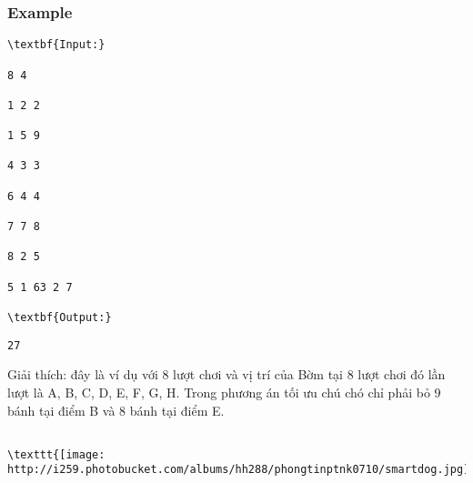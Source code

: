\subsubsection{   Example  }
\begin{verbatim}
\textbf{Input:}

8 4

1 2 2

1 5 9

4 3 3

6 4 4

7 7 8

8 2 5

5 1 63 2 7

\textbf{Output:}\end{verbatim}
\begin{verbatim}
27\end{verbatim}

Giải thích: đây là ví dụ với 8 lượt chơi và vị trí của Bờm tại 8 lượt chơi đó lần lượt là A, B, C, D, E, F, G, H. Trong phương án tối ưu chú chó chỉ phải bỏ 9 bánh tại điểm B và 8 bánh tại điểm E.
\begin{verbatim}

\texttt{[image: http://i259.photobucket.com/albums/hh288/phongtinptnk0710/smartdog.jpg]}\end{verbatim}
